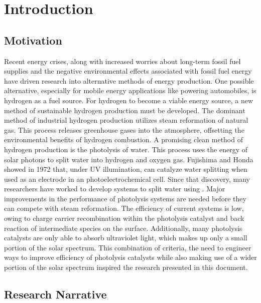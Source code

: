 \chapter{Introduction}
\label{ch:introduction}


\section{Motivation}
\label{sec:intro.motivation}


Recent energy crises, along with increased worries about long-term fossil 
fuel supplies and the negative environmental effects associated with fossil 
fuel energy have driven research into alternative methods of energy 
production. One possible alternative, especially for mobile energy 
applications like powering automobiles, is hydrogen as a fuel source. For 
hydrogen to become a viable energy source, a new method of sustainable 
hydrogen production must be developed. The dominant method of industrial 
hydrogen production utilizes steam reformation of natural gas.
\cite{Report:2004wb} This process releases greenhouse gases into the 
atmosphere, offsetting the environmental benefits of hydrogen combustion. 
A promising clean method of hydrogen production is the photolysis of water. 
This process uses the energy of solar photons to split water into hydrogen 
and oxygen gas. Fujishima and Honda\cite{Fujishima:1972hc} showed in 1972 
that, under UV illumination,  can catalyze water splitting when 
used as an electrode in an photoelectrochemical cell. Since that discovery, 
many researchers have worked to develop systems to split water using 
.\cite{User:2001tg,Frank:1987hd,Karakitsou:1993fq,%
Linsebigler:1995gi,Schrauzer:1977ex} Major improvements in the performance 
of photolysis systems are needed before they can compete with steam 
reformation. The efficiency of current systems is low, owing to charge 
carrier recombination within the photolysis catalyst and back reaction of 
intermediate species on the surface. Additionally, many photolysis 
catalysts are only able to absorb ultraviolet light, which makes up only a 
small portion of the solar spectrum. This combination of criteria, the need 
to engineer ways to improve efficiency of photolysis catalysts while also 
making use of a wider portion of the solar spectrum inspired the research 
presented in this document.


\section{Research Narrative}
\label{sec:intro.objectives}


